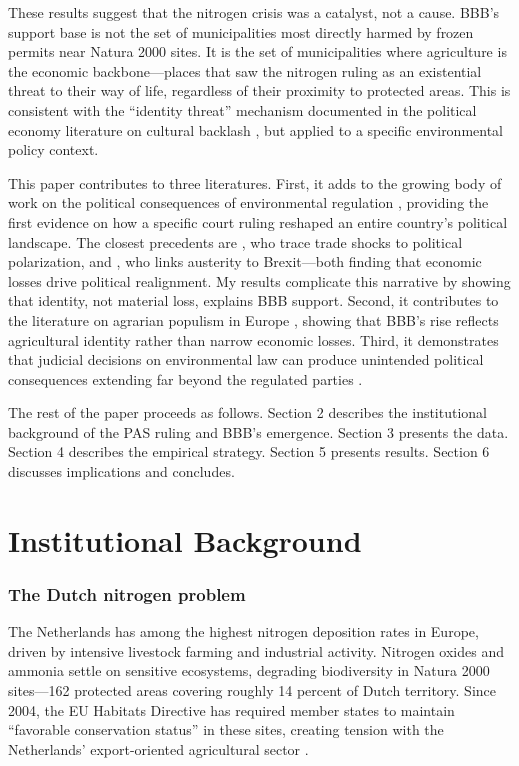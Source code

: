 \documentclass[12pt]{article}
\begin{document}
These results suggest that the nitrogen crisis was a catalyst, not a cause. BBB's support base is not the set of municipalities most directly harmed by frozen permits near Natura 2000 sites. It is the set of municipalities where agriculture is the economic backbone---places that saw the nitrogen ruling as an existential threat to their way of life, regardless of their proximity to protected areas. This is consistent with the ``identity threat'' mechanism documented in the political economy literature on cultural backlash \citep{norris2019, guriev2022}, but applied to a specific environmental policy context.

This paper contributes to three literatures. First, it adds to the growing body of work on the political consequences of environmental regulation \citep{walker2013, colmer2023, gazze2024}, providing the first evidence on how a specific court ruling reshaped an entire country's political landscape. The closest precedents are \citet{autor2020}, who trace trade shocks to political polarization, and \citet{fetzer2019}, who links austerity to Brexit---both finding that economic losses drive political realignment. My results complicate this narrative by showing that identity, not material loss, explains BBB support. Second, it contributes to the literature on agrarian populism in Europe \citep{mamonova2020, rodrik2018, funke2016}, showing that BBB's rise reflects agricultural identity rather than narrow economic losses. Third, it demonstrates that judicial decisions on environmental law can produce unintended political consequences extending far beyond the regulated parties \citep{guriev2022, dippel2022}.

The rest of the paper proceeds as follows. Section 2 describes the institutional background of the PAS ruling and BBB's emergence. Section 3 presents the data. Section 4 describes the empirical strategy. Section 5 presents results. Section 6 discusses implications and concludes.

\section{Institutional Background}

\subsubsection*{The Dutch nitrogen problem} The Netherlands has among the highest nitrogen deposition rates in Europe, driven by intensive livestock farming and industrial activity. Nitrogen oxides and ammonia settle on sensitive ecosystems, degrading biodiversity in Natura 2000 sites---162 protected areas covering roughly 14 percent of Dutch territory. Since 2004, the EU Habitats Directive has required member states to maintain ``favorable conservation status'' in these sites, creating tension with the Netherlands' export-oriented agricultural sector \citep{erisman2003}.
\end{document}

